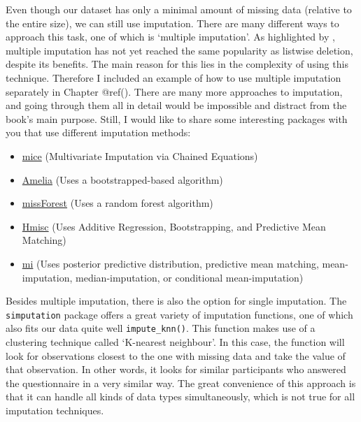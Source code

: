 \documentclass[
]{book}
\begin{document}
Even though our dataset has only a minimal amount of missing data (relative to the entire size), we can still use imputation. There are many different ways to approach this task, one of which is `multiple imputation'. As highlighted by \citet{van2020rebutting}, multiple imputation has not yet reached the same popularity as listwise deletion, despite its benefits. The main reason for this lies in the complexity of using this technique. Therefore I included an example of how to use multiple imputation separately in Chapter @ref(). There are many more approaches to imputation, and going through them all in detail would be impossible and distract from the book's main purpose. Still, I would like to share some interesting packages with you that use different imputation methods:

\begin{itemize}
\item
  \href{https://cran.r-project.org/web/packages/Amelia/index.html}{mice} (Multivariate Imputation via Chained Equations)
\item
  \href{https://cran.r-project.org/web/packages/Amelia/index.html}{Amelia} (Uses a bootstrapped-based algorithm)
\item
  \href{https://cran.r-project.org/web/packages/missForest/index.html}{missForest} (Uses a random forest algorithm)
\item
  \href{https://cran.r-project.org/web/packages/Hmisc/index.html}{Hmisc} (Uses Additive Regression, Bootstrapping, and Predictive Mean Matching)
\item
  \href{https://cran.r-project.org/web/packages/mi/index.html}{mi} (Uses posterior predictive distribution, predictive mean matching, mean-imputation, median-imputation, or conditional mean-imputation)
\end{itemize}

Besides multiple imputation, there is also the option for single imputation. The \texttt{simputation} package offers a great variety of imputation functions, one of which also fits our data quite well \texttt{impute\_knn()}. This function makes use of a clustering technique called `K-nearest neighbour'. In this case, the function will look for observations closest to the one with missing data and take the value of that observation. In other words, it looks for similar participants who answered the questionnaire in a very similar way. The great convenience of this approach is that it can handle all kinds of data types simultaneously, which is not true for all imputation techniques.
\end{document}
